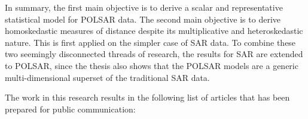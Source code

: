 In summary, the first main objective is to derive a scalar and representative statistical model for POLSAR data.
The second main objective is to derive homoskedastic measures of distance despite its multiplicative and heteroskedastic nature.
This is first applied on the simpler case of SAR data. %
To combine these two seemingly disconnected threads of research, the results for SAR are extended to POLSAR,
  since the thesis also shows that the POLSAR models are a generic multi-dimensional superset of the traditional SAR data. %

The work in this research results in the following list of articles that has been prepared for public communication: 

